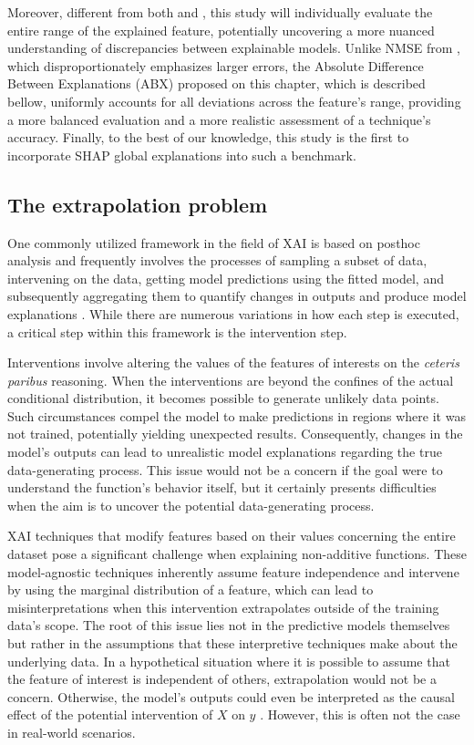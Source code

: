 Moreover, different from both \cite{Molnar2023Model-agnosticApproach} and \cite{Gkolemis2022DALE:Explanations}, this study will individually evaluate the entire range of the explained feature, potentially uncovering a more nuanced understanding of discrepancies between explainable models. Unlike NMSE from \cite{Gkolemis2022DALE:Explanations}, which disproportionately emphasizes larger errors, the Absolute Difference Between Explanations (ABX) proposed on this chapter, which is described bellow, uniformly accounts for all deviations across the feature's range, providing a more balanced evaluation and a more realistic assessment of a technique's accuracy. Finally, to the best of our knowledge, this study is the first to incorporate SHAP global explanations into such a benchmark.


\subsection{The extrapolation problem}

One commonly utilized framework in the field of XAI is based on post\-hoc analysis and frequently involves the processes of sampling a subset of data, intervening on the data, getting model predictions using the fitted model, and subsequently aggregating them to quantify changes in outputs and produce model explanations \cite{Scholbeck2020SamplingInterpretations}. While there are numerous variations in how each step is executed, a critical step within this framework is the intervention step.

Interventions involve altering the values of the features of interests on the \textit{ceteris paribus} reasoning. When the interventions are beyond the confines of the actual conditional distribution, it becomes possible to generate unlikely data points. Such circumstances compel the model to make predictions in regions where it was not trained, potentially yielding unexpected results. Consequently, changes in the model's outputs can lead to unrealistic model explanations regarding the true data-generating process. This issue would not be a concern if the goal were to understand the function's behavior itself, but it certainly presents difficulties when the aim is to uncover the potential data-generating process.

XAI techniques that modify features based on their values concerning the entire dataset pose a significant challenge when explaining non-additive functions. These model-agnostic techniques inherently assume feature independence and intervene by using the marginal distribution of a feature, which can lead to misinterpretations when this intervention extrapolates outside of the training data's scope. The root of this issue lies not in the predictive models themselves but rather in the assumptions that these interpretive techniques make about the underlying data. In a hypothetical situation where it is possible to assume that the feature of interest is independent of others, extrapolation would not be a concern. Otherwise, the model's outputs could even be interpreted as the causal effect of the potential intervention of \(X\) on \(y\) \cite{Zhao2021CausalModels}. However, this is often not the case in real-world scenarios. 


